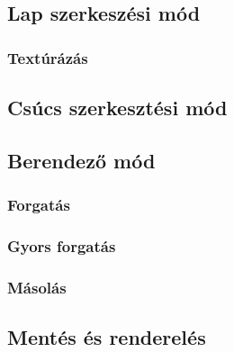 \subsection{Lap szerkeszési mód}

\subsubsection{Textúrázás}

\subsection{Csúcs szerkesztési mód}

\subsection{Berendező mód}

\subsubsection{Forgatás}

\subsubsection{Gyors forgatás}

\subsubsection{Másolás}

\subsection{Mentés és renderelés}